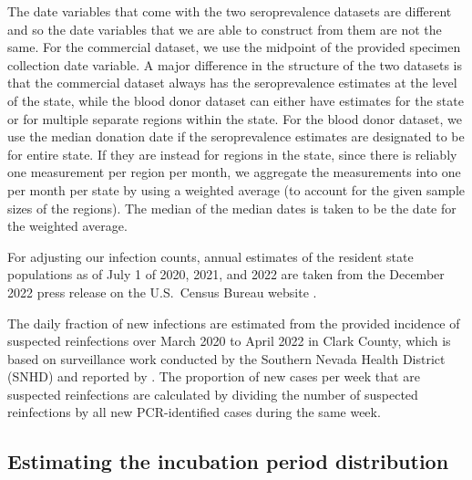 \documentclass{article}
\begin{document}
The date variables that come with the two seroprevalence datasets are different
and so the date variables that we are able to construct from them are
not the same. For the commercial dataset, we use the midpoint of the provided
specimen collection date variable. A major difference in the structure of the
two datasets is that the commercial dataset always has the seroprevalence
estimates at the level of the state, while the blood donor dataset can either have 
estimates for the state or for multiple separate regions within the state. For the 
blood donor dataset, we use the median donation date if the seroprevalence 
estimates are designated to be for entire state. If they are instead for regions in 
the state, since there is reliably one measurement per region per month, we 
aggregate the measurements into one per month per state by using a weighted 
average (to account for the given sample sizes of the regions). The median of the 
median dates is taken to be the date for the weighted average.

For adjusting our infection counts, annual estimates of the resident state
populations as of July 1 of 2020, 2021, and 2022 are taken from the December
2022 press release on the U.S.\ Census Bureau website \citep{uscensus2022annual}.

The daily fraction of new infections are estimated from the provided incidence
of suspected reinfections over March 2020 to April 2022 in Clark County, which
is based on surveillance work conducted by the Southern Nevada Health District
(SNHD) and reported by \citet{ruff2022rapid}. The proportion of new cases per
week that are suspected reinfections are calculated by dividing the number of
suspected reinfections by all new PCR-identified cases during the same week. 


\subsection{Estimating the incubation period distribution} 
\end{document}
